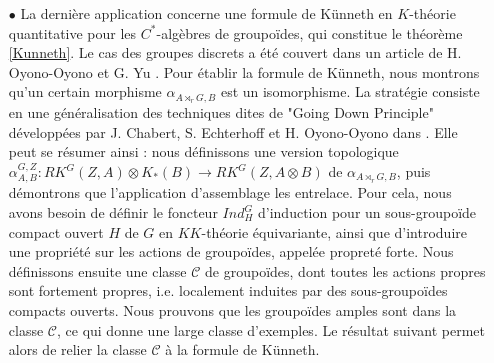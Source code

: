 \begin{itemize}
\item[$\bullet$] La dernière application concerne une formule de Künneth en $K$-théorie quantitative pour les $C^*$-algèbres de groupoïdes, qui constitue le théorème \ref{Kunneth}. Le cas des groupes discrets a été couvert dans un article de H. Oyono-Oyono et G. Yu \cite{OY4}. Pour établir la formule de Künneth, nous montrons qu'un certain morphisme $\alpha_{A\rtimes_r G,B}$ est un isomorphisme. La stratégie consiste en une généralisation des techniques dites de "Going Down Principle" développées par J. Chabert, S. Echterhoff et H. Oyono-Oyono dans \cite{ChabertEOY}. Elle peut se résumer ainsi : nous définissons une version topologique $\alpha_{A,B}^{G,Z} : RK^G(Z,A)\otimes K_*(B)\rightarrow RK^G(Z,A\otimes B )$ de $\alpha_{A\rtimes_r G,B}$, puis démontrons que l'application d'assemblage les entrelace. Pour cela, nous avons besoin de définir le foncteur $Ind_H^G$ d'induction pour un sous-groupoïde compact ouvert $H$ de $G$ en $KK$-théorie équivariante, ainsi que d'introduire une propriété sur les actions de groupoïdes, appelée propreté forte. Nous définissons ensuite une classe $\mathcal C$ de groupoïdes, dont toutes les actions propres sont fortement propres, i.e. localement induites par des sous-groupoïdes compacts ouverts. Nous prouvons que les groupoïdes amples sont dans la classe $\mathcal C$, ce qui donne une large classe d'exemples. Le résultat suivant permet alors de relier la classe $\mathcal C$ à la formule de Künneth. \\



\end{itemize}
